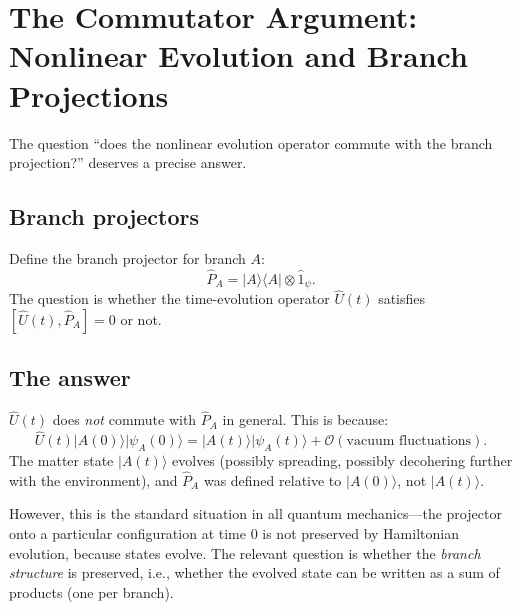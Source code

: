 \documentclass[12pt,a4paper]{article}
\newcommand{\order}[1]{\mathcal{O}(#1)}
\begin{document}
\section{The Commutator Argument: Nonlinear Evolution and
Branch Projections}
\label{sec:commutator}

The question ``does the nonlinear evolution operator commute with the
branch projection?'' deserves a precise answer.

\subsection{Branch projectors}

Define the branch projector for branch $A$:
\begin{equation}
\hat{P}_A = |A\rangle\langle A| \otimes \hat{1}_\psi.
\end{equation}
The question is whether the time-evolution operator $\hat{U}(t)$
satisfies $[\hat{U}(t), \hat{P}_A] = 0$ or not.

\subsection{The answer}

$\hat{U}(t)$ does \emph{not} commute with $\hat{P}_A$ in general.
This is because:
\begin{equation}
\hat{U}(t)|A(0)\rangle|\psi_A(0)\rangle
= |A(t)\rangle|\psi_A(t)\rangle + \order{\text{vacuum fluctuations}}.
\end{equation}
The matter state $|A(t)\rangle$ evolves (possibly spreading, possibly
decohering further with the environment), and $\hat{P}_A$ was defined
relative to $|A(0)\rangle$, not $|A(t)\rangle$.

However, this is the standard situation in all quantum mechanics---the
projector onto a particular configuration at time 0 is not preserved by
Hamiltonian evolution, because states evolve. The relevant question is
whether the \emph{branch structure} is preserved, i.e., whether the
evolved state can be written as a sum of products (one per branch).
\end{document}
